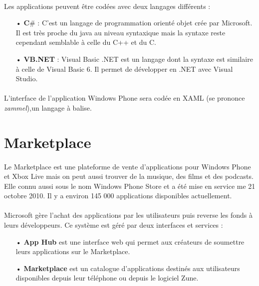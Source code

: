 \documentclass[twoside,UTF8]{EPURapport}
\begin{document}
\paragraph{}
Les applications peuvent être codées avec deux langages différents : 
\begin{itemize}
	\item[•]\textbf{C$\#$} : C'est un langage de programmation orienté objet crée par Microsoft. Il est très proche du java au niveau syntaxique mais la syntaxe reste cependant semblable à celle du C++ et du C. 
	\item[•]\textbf{VB.NET} : Visual Basic .NET est un langage dont la syntaxe est similaire à celle de Visual Basic 6. Il permet de développer en .NET avec Visual Studio.
\end{itemize}

\paragraph{}
L'interface de l'application Windows Phone sera codée en XAML (se prononce \textit{zammel}),un langage à balise.  

\section{Marketplace}

\paragraph{}
Le Marketplace est une plateforme de vente d'applications pour Windows Phone et Xbox Live mais on peut aussi trouver de la musique, des films et des podcasts. Elle connu aussi sous le nom Windows Phone Store et a été mise en service me 21 octobre 2010. Il y a environ 145 000 applications disponibles actuellement.

\paragraph{}
Microsoft gère l'achat des applications par les utilisateurs puis reverse les fonds à leurs développeurs. Ce système est géré par deux interfaces et services : 
\begin{itemize}
	\item[•] \textbf{App Hub} est une interface web qui permet aux créateurs de soumettre leurs applications sur le Marketplace.
	\item[•]\textbf{Marketplace} est un catalogue d'applications destinés aux utilisateurs disponibles depuis leur téléphone ou depuis le logiciel Zune.
\end{itemize}
\end{document}
